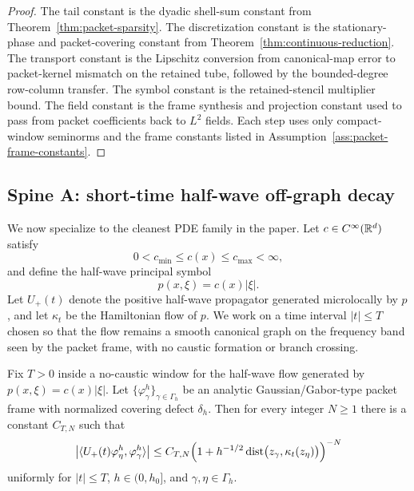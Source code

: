 \begin{proof}
The tail constant is the dyadic shell-sum constant from Theorem~\ref{thm:packet-sparsity}. The discretization constant is the stationary-phase and packet-covering constant from Theorem~\ref{thm:continuous-reduction}. The transport constant is the Lipschitz conversion from canonical-map error to packet-kernel mismatch on the retained tube, followed by the bounded-degree row-column transfer. The symbol constant is the retained-stencil multiplier bound. The field constant is the frame synthesis and projection constant used to pass from packet coefficients back to $L^2$ fields. Each step uses only compact-window seminorms and the frame constants listed in Assumption~\ref{ass:packet-frame-constants}.
\end{proof}

\subsection{Spine A: short-time half-wave off-graph decay}

We now specialize to the cleanest PDE family in the paper. Let $c\in C^\infty(\mathbb R^d)$ satisfy
\[
0<c_{\min}\le c(x)\le c_{\max}<\infty,
\]
and define the half-wave principal symbol
\[
p(x,\xi)=c(x)|\xi|.
\]
Let $U_+(t)$ denote the positive half-wave propagator generated microlocally by $p$, and let $\kappa_t$ be the Hamiltonian flow of $p$. We work on a time interval $|t|\le T$ chosen so that the flow remains a smooth canonical graph on the frequency band seen by the packet frame, with no caustic formation or branch crossing.

\begin{theorem}
\label{thm:wave-offgraph}
Fix $T>0$ inside a no-caustic window for the half-wave flow generated by $p(x,\xi)=c(x)|\xi|$. Let $\{\varphi_\gamma^h\}_{\gamma\in\Gamma_h}$ be an analytic Gaussian/Gabor-type packet frame with normalized covering defect $\delta_h$. Then for every integer $N\ge 1$ there is a constant $C_{T,N}$ such that
\begin{equation}
\label{eq:offgraph}
\bigl|\langle U_+(t)\varphi_\eta^h,\varphi_\gamma^h\rangle\bigr|
\le
C_{T,N}
\Bigl(1+h^{-1/2}\,\mathrm{dist}\bigl(z_\gamma,\kappa_t(z_\eta)\bigr)\Bigr)^{-N}
\end{equation}
uniformly for $|t|\le T$, $h\in(0,h_0]$, and $\gamma,\eta\in\Gamma_h$.
\end{theorem}

